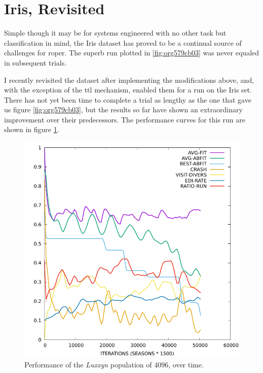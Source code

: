 \documentclass[12pt,glossary]{dalthesis}
\begin{document}
\section{Iris, Revisited}
\label{sec:orgf9246a8}
Simple though it may be for systems engineered with no other task but classification in mind, the Iris dataset has 
proved to be a continual source of challenges for \gls{roper}. The superb run plotted in
\ref{fig:org579cb03} was never equaled in subsequent trials. 

I recently revisited the dataset after implementing the modifications above, and, with
the exception of the \gls{ttl} mechanism, enabled them for a run on the Iris set. There
has not yet been time to complete a trial as lengthy as the one that gave us figure
\ref{fig:org579cb03}, but the results so far have shown an extraordinary improvement over
their predecessors. The performance curves for this run are shown in figure \ref{fig:org2fd23ab}. 



\begin{figure}[htbp]
\centering
\includegraphics[width=.9\linewidth]{../images/plots/luxxyn.pdf}
\caption{\label{fig:org2fd23ab}
Performance of the \emph{Luxxyn} population of 4096, over time.}
\end{figure}
\end{document}
